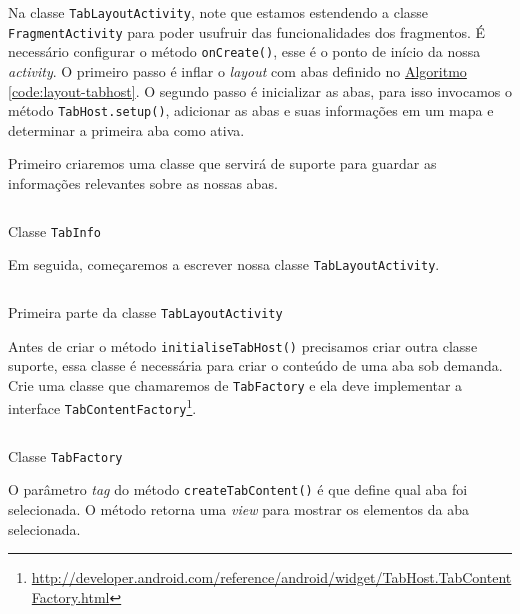 \documentclass[a4paper,12pt,brazil,oneside]{book}
\begin{document}
\begin{singlespace}
	Na classe \texttt{TabLayoutActivity}, note que estamos estendendo a classe \texttt{FragmentActivity} para poder usufruir das funcionalidades dos fragmentos. É necessário configurar o método \texttt{onCreate()}, esse é o ponto de início da nossa \emph{activity}. O primeiro passo é inflar o \emph{layout} com abas definido no \hyperref[code:layout-tabhost]{Algoritmo \ref*{code:layout-tabhost}}. O segundo passo é inicializar as abas, para isso invocamos o método \texttt{TabHost.setup()}, adicionar as abas e suas informações em um mapa e determinar a primeira aba como ativa.
	
	Primeiro criaremos uma classe que servirá de suporte para guardar as informações relevantes sobre as nossas abas.
	
	\begin{listing}[H]
	\inputminted[linenos=true,fontsize=\small,frame=lines, framesep=2mm, tabsize=2,numbersep=5pt]{java}{src/design/tabinfo.java}
	\caption{Classe \texttt{TabInfo}}
	\end{listing}
	
	Em seguida, começaremos a escrever nossa classe \texttt{TabLayoutActivity}.
	
 	\begin{listing}[H]
	\inputminted[linenos=true,fontsize=\small,frame=lines, framesep=2mm, tabsize=2,numbersep=5pt]{java}{src/design/tab-activity1.java}
	\caption{Primeira parte da classe \texttt{TabLayoutActivity}}
	\end{listing}
	
	Antes de criar o método \texttt{initialiseTabHost()} precisamos criar outra classe suporte, essa classe é necessária para criar o conteúdo de uma aba sob demanda. Crie uma classe que chamaremos de \texttt{TabFactory} e ela deve implementar a interface \texttt{TabContentFactory}\footnote{\href{http://developer.android.com/reference/android/widget/TabHost.TabContentFactory.html}{http://developer.android.com/reference/android/widget/TabHost.TabContentFactory.html}}.
	
	\begin{listing}[H]
	\inputminted[linenos=true,fontsize=\small,frame=lines, framesep=2mm, tabsize=2,numbersep=5pt]{java}{src/design/tab-factory.java}
	\caption{Classe \texttt{TabFactory}}
	\end{listing}
	
	O parâmetro \emph{tag} do método \texttt{createTabContent()} é que define qual aba foi selecionada. O método retorna uma \emph{view} para mostrar os elementos da aba selecionada.
	

\end{singlespace}
\end{document}
